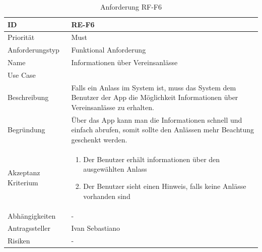 \begin{table}[ht]
\centering
  \begin{tabular}{ l | p{8cm} }
	\hline
	\rowcolor{gray}
	ID 			&	\textbf{RE-F6}\\ \hline
	Priorität 		&	Must\\ \hline
	Anforderungstyp	&	Funktional Anforderung\\ \hline
	Name 			&	Informationen über Vereinsanlässe\\ \hline
	Use Case 		&	\nameref{table:use_case_5}\\ \hline
	Beschreibung 	&	Falls ein Anlass im System ist, muss das System dem Benutzer der App die Möglichkeit Informationen über Vereinsanlässe zu erhalten.\\ \hline
	Begründung 		&	Über das App kann man die Informationen schnell und einfach abrufen, somit sollte den Anlässen mehr Beachtung geschenkt werden.\\ \hline
	Akzeptanz Kriterium	&	\begin{enumerate}
					\item Der Benutzer erhält informationen über den ausgewählten Anlass
					\item Der Benutzer sieht einen Hinweis, falls keine Anlässe vorhanden sind
					\end{enumerate}
					\\ \hline
	Abhängigkeiten 	&	-\\ \hline
	Antragssteller 	&	Ivan Sebastiano\\ \hline
	Risiken	 	&	-
  \end{tabular}
   \caption{Anforderung RF-F6}\label{table:req_6}
\end{table}

